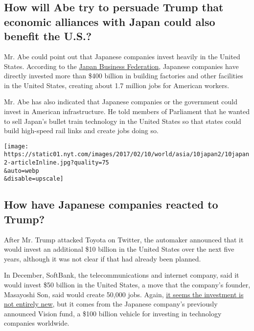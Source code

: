 \hypertarget{how-will-abe-try-to-persuade-trump-that-economic-alliances-with-japan-could-also-benefit-the-us}{%
\subsection{How will Abe try to persuade Trump that economic alliances
with Japan could also benefit the
U.S.?}\label{how-will-abe-try-to-persuade-trump-that-economic-alliances-with-japan-could-also-benefit-the-us}}

Mr. Abe could point out that Japanese companies invest heavily in the
United States. According to the \href{http://keidanren.us/}{Japan
Business Federation}, Japanese companies have directly invested more
than \$400 billion in building factories and other facilities in the
United States, creating about 1.7 million jobs for American workers.

Mr. Abe has also indicated that Japanese companies or the government
could invest in American infrastructure. He told members of Parliament
that he wanted to sell Japan's bullet train technology in the United
States so that states could build high-speed rail links and create jobs
doing so.

\texttt{[image: https://static01.nyt.com/images/2017/02/10/world/asia/10japan2/10japan2-articleInline.jpg?quality=75\\\&auto=webp\\\&disable=upscale]}

\hypertarget{how-have-japanese-companies-reacted-to-trump}{%
\subsection{How have Japanese companies reacted to
Trump?}\label{how-have-japanese-companies-reacted-to-trump}}

After Mr. Trump attacked Toyota on Twitter, the automaker announced that
it would invest an additional \$10 billion in the United States over the
next five years, although it was not clear if that had already been
planned.

In December, SoftBank, the telecommunications and internet company, said
it would invest \$50 billion in the United States, a move that the
company's founder, Masayoshi Son, said would create 50,000 jobs. Again,
\href{https://www.nytimes.com/2016/12/06/business/dealbook/donald-trump-mayayoshi-son-softbank.html}{it
seems the investment is not entirely new}, but it comes from the
Japanese company's previously announced Vision fund, a \$100 billion
vehicle for investing in technology companies worldwide.

